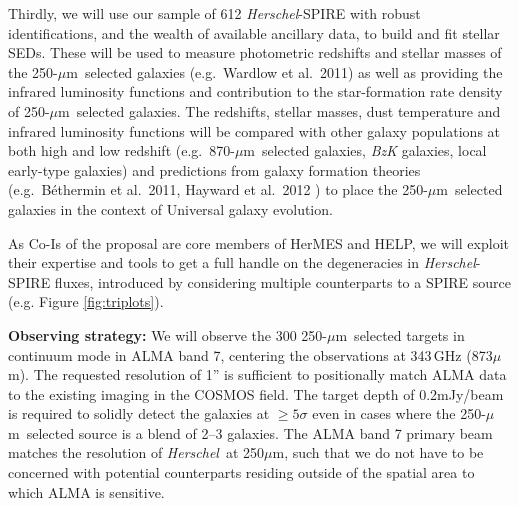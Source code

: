 \documentclass[12pt,a4paper]{article}
\newcommand{\herschel}{{\it Herschel}}
\newcommand{\micron}{$\mu$m}
\begin{document}
Thirdly, we will use our sample of 612 \herschel-SPIRE with robust identifications, and the wealth of available ancillary data, to build and fit
stellar SEDs. These will be used to measure photometric redshifts and
stellar masses of the 250-\micron\ selected galaxies (e.g.\ Wardlow et
al.\ 2011) as well as providing the infrared
luminosity functions and contribution to the star-formation rate
density of 250-\micron\ selected galaxies. The redshifts, stellar
masses, dust temperature and infrared luminosity functions will be
compared with other galaxy populations at both high and low redshift
(e.g.\ 870-\micron\ selected galaxies, {\it BzK} galaxies, local
early-type galaxies) and predictions from galaxy formation theories
(e.g.\ B\'ethermin et al.\ 2011, Hayward et al.\ 2012 ) to place the
250-\micron\ selected galaxies in the context of Universal galaxy
evolution.

As Co-Is of the proposal are core members of HerMES and HELP, we will exploit their expertise and tools to get a full handle on the degeneracies in \herschel-SPIRE fluxes, introduced by considering multiple counterparts to a SPIRE source (e.g. Figure \ref{fig:triplots}).



\hspace{0.2cm}
{\bf Observing strategy:}
We will observe the 300 250-\micron\ selected targets in continuum
mode in ALMA band 7, centering the observations at 343\,GHz
(873\micron). 
%
The requested resolution of 1'' is sufficient to positionally match
ALMA data to the existing imaging in the COSMOS field. The target depth of 0.2mJy/beam
is required to solidly detect the galaxies at $\ge5\sigma$ even in
cases where the 250-\micron\ selected source is a blend of 2--3
galaxies. The ALMA band 7 primary beam matches the resolution of
\herschel\ at 250\micron, such that we do not have to be concerned
with potential counterparts residing outside of the spatial area to
which ALMA is sensitive.
\end{document}
